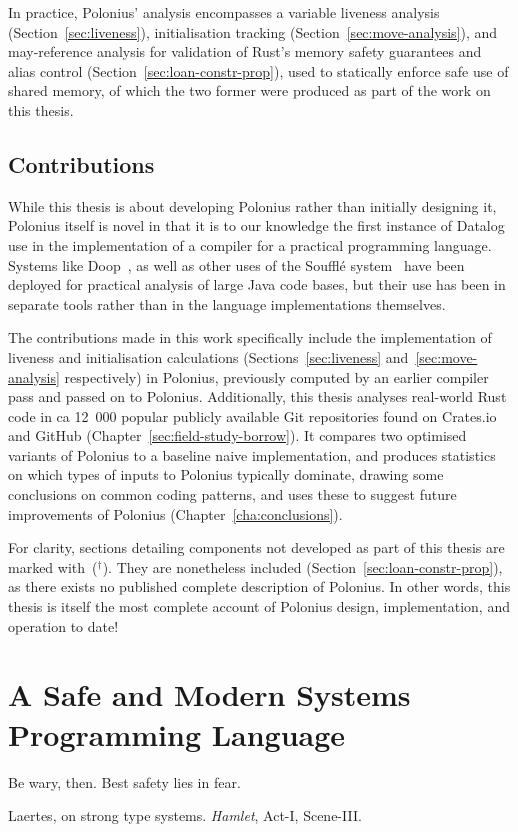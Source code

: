\documentclass[11pt,a4paper,twoside,openany]{report}
\newcommand{\notmine}[0] {$^\dagger$}
\begin{document}
In practice, Polonius' analysis encompasses a variable liveness analysis
(Section~\ref{sec:liveness}), initialisation tracking
(Section~\ref{sec:move-analysis}), and may-reference analysis for validation of
Rust's memory safety guarantees and alias control
(Section~\ref{sec:loan-constr-prop}), used to statically enforce safe use of
shared memory, of which the two former were produced as part of the work on this
thesis.

\section{Contributions}\label{sec:contributions}

While this thesis is about developing Polonius rather than initially designing
it, Polonius itself is novel in that it is to our knowledge the first instance
of Datalog use in the implementation of a compiler for a practical programming
language. Systems like Doop~\cite{bravenboer_strictly_2009}, as well as other
uses of the Souffl{\'e} system~\cite{souffle} have been deployed for practical
analysis of large Java code bases, but their use has been in separate tools
rather than in the language implementations themselves.

The contributions made in this work specifically include the implementation of
liveness and initialisation calculations (Sections~\ref{sec:liveness}
and~\ref{sec:move-analysis} respectively) in Polonius, previously computed by an
earlier compiler pass and passed on to Polonius. Additionally, this thesis
analyses real-world Rust code in ca 12~000 popular publicly available Git
repositories found on Crates.io and GitHub
(Chapter~\ref{sec:field-study-borrow}). It compares two optimised variants of
Polonius to a baseline naive implementation, and produces statistics on which
types of inputs to Polonius typically dominate, drawing some conclusions on
common coding patterns, and uses these to suggest future improvements of
Polonius (Chapter~\ref{cha:conclusions}).

For clarity, sections detailing components not developed as part of this thesis
are marked with~(\notmine{}). They are nonetheless included
(Section~\ref{sec:loan-constr-prop}), as there exists no published complete
description of Polonius. In other words, this thesis is itself the most complete
account of Polonius design, implementation, and operation to date!

\chapter{A Safe and Modern Systems Programming Language}\label{cha:background}
\epigraph{Be wary, then. Best safety lies in fear.}%
{Laertes, on strong type systems. \textit{Hamlet}, Act-I, Scene-III.}
\end{document}
